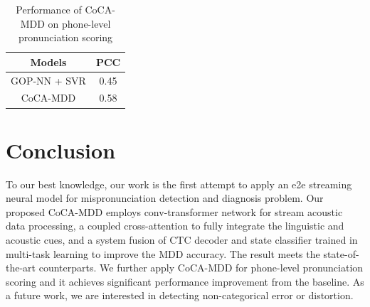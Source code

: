 \documentclass[a4paper]{article}
\begin{document}
\begin{table}[tb]
\centering
\caption{Performance of CoCA-MDD on phone-level pronunciation scoring}
\vspace{-1mm}
\begin{tabular}{cc}
\hline
Models     & PCC  \\ \hline
GOP-NN + SVR \cite{zhang2021speechocean762} & 0.45 \\
CoCA-MDD       & 0.58 \\ \hline
\end{tabular}
\label{tab:t3}
\vspace{-4mm}
\end{table}

\section{Conclusion}
To our best knowledge, our work is the first attempt to apply an e2e streaming neural model for mispronunciation detection and diagnosis problem. Our proposed CoCA-MDD employs conv-transformer network for stream acoustic data processing, a coupled cross-attention to fully integrate the linguistic and acoustic cues, and a system fusion of CTC decoder and state classifier trained in multi-task learning to improve the MDD accuracy. The result meets the state-of-the-art counterparts.
We further apply CoCA-MDD for phone-level pronunciation scoring and it achieves significant performance improvement from the baseline. As a future work, we are interested in detecting non-categorical error or distortion.


%


\end{document}
